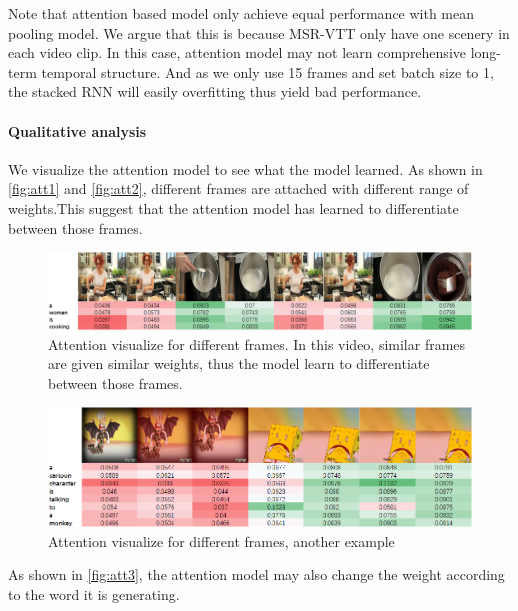 Note that attention based model only achieve equal performance with mean pooling model. We argue that this is because MSR-VTT only have one scenery in each video clip. In this case, attention model may not learn comprehensive long-term temporal structure. And as we only use 15 frames and set batch size to 1, the stacked RNN will easily overfitting thus yield bad performance.

\paragraph{Qualitative analysis}
We visualize the attention model to see what the model learned. As shown in \autoref{fig:att1} and \autoref{fig:att2}, different frames are attached with different range of weights.This suggest that the attention model has learned to differentiate between those frames.

\begin{figure}[htbp]
\centering
\includegraphics[width=14cm]{resources/att1.png}
\caption{Attention visualize for different frames. In this video, similar frames are given similar weights, thus the model learn to differentiate between those frames.}
\label{fig:att1}
\end{figure}

\begin{figure}[htbp]
\centering
\includegraphics[width=14cm]{resources/att2.png}
\caption{Attention visualize for different frames, another example}
\label{fig:att2}
\end{figure}

As shown in \autoref{fig:att3}, the attention model may also change the weight according to the word it is generating.

